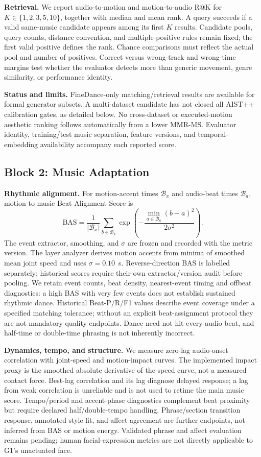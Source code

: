 \textbf{Retrieval.} We report audio-to-motion and motion-to-audio R@K for
$K\in\{1,2,3,5,10\}$, together with median and mean rank. A query succeeds if a
valid same-music candidate appears among its first $K$ results. Candidate pools,
query counts, distance convention, and multiple-positive rules remain fixed;
the first valid positive defines the rank. Chance comparisons must reflect
the actual pool and number of positives. Correct versus wrong-track and
wrong-time margins test whether the evaluator detects more than generic
movement, genre similarity, or performance identity.

\textbf{Status and limits.} FineDance-only matching/retrieval results are
available for formal generator subsets. A multi-dataset candidate has not
closed all AIST++ calibration gates, as detailed below. No cross-dataset or
executed-motion aesthetic ranking follows automatically from a lower MMR-MS.
Evaluator identity, training/test music separation, feature versions, and
temporal-embedding availability accompany each reported score.

\subsection{Block 2: Music Adaptation}
\textbf{Rhythmic alignment.} For motion-accent times $\mathcal{B}_x$ and
audio-beat times $\mathcal{B}_a$, motion-to-music Beat Alignment Score is
\begin{equation}
 \mathrm{BAS}=\frac{1}{|\mathcal{B}_x|}
 \sum_{b\in\mathcal{B}_x}
 \exp\!\left(-\frac{\min_{a\in\mathcal{B}_a}(b-a)^2}{2\sigma^2}\right).
 \label{eq:bas}
\end{equation}
The event extractor, smoothing, and $\sigma$ are frozen and recorded with the
metric version. The layer analyzer derives motion accents from minima of
smoothed mean joint speed and uses $\sigma=0.10$~s. Reverse-direction BAS is
labelled separately; historical scores require their own extractor/version
audit before pooling.
We retain event counts, beat density, nearest-event timing and offbeat
diagnostics: a high BAS with very few events does not establish sustained
rhythmic dance. Historical Beat-P/R/F1 values describe event coverage under a
specified matching tolerance; without an explicit beat-assignment protocol
they are not mandatory quality endpoints. Dance need not hit every audio beat,
and half-time or double-time phrasing is not inherently incorrect.

\textbf{Dynamics, tempo, and structure.} We measure zero-lag audio-onset
correlation with joint-speed and motion-impact curves. The implemented impact
proxy is the smoothed absolute derivative of the speed curve, not a measured
contact force. Best-lag correlation and its lag diagnose delayed response;
a lag from weak correlation is unreliable and is not used to retime the main
music score. Tempo/period and accent-phase diagnostics complement beat proximity
but require declared half/double-tempo handling. Phrase/section transition
response, annotated style fit, and affect agreement are further endpoints,
not inferred from BAS or motion energy. Validated phrase and affect evaluation
remains pending; human facial-expression metrics are not directly applicable
to G1's unactuated face.

